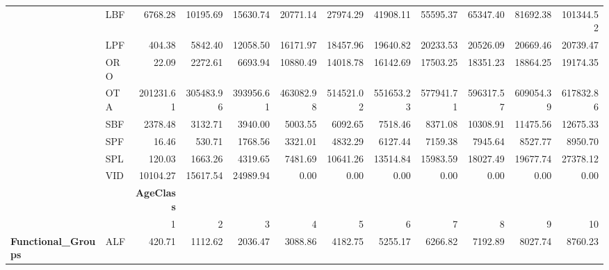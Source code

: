 \documentclass[11pt]{article}
\begin{document}
\begin{table}[htb]
\begin{center}
\begin{tabular}{llrrrrrrrrrr}
                             &  LBF  &            6768.28  &      10195.69  &      15630.74  &      20771.14  &      27974.29  &      41908.11  &      55595.37  &      65347.40  &      81692.38  &     101344.52  \\
                             &  LPF  &             404.38  &       5842.40  &      12058.50  &      16171.97  &      18457.96  &      19640.82  &      20233.53  &      20526.09  &      20669.46  &      20739.47  \\
                             &  ORO  &              22.09  &       2272.61  &       6693.94  &      10880.49  &      14018.78  &      16142.69  &      17503.25  &      18351.23  &      18864.25  &      19174.35  \\
                             &  OTA  &          201231.61  &     305483.96  &     393956.61  &     463082.98  &     514521.02  &     551653.23  &     577941.71  &     596317.57  &     609054.39  &     617832.86  \\
                             &  SBF  &            2378.48  &       3132.71  &       3940.00  &       5003.55  &       6092.65  &       7518.46  &       8371.08  &      10308.91  &      11475.56  &      12675.33  \\
                             &  SPF  &              16.46  &        530.71  &       1768.56  &       3321.01  &       4832.29  &       6127.44  &       7159.38  &       7945.64  &       8527.77  &       8950.70  \\
                             &  SPL  &             120.03  &       1663.26  &       4319.65  &       7481.69  &      10641.26  &      13514.84  &      15983.59  &      18027.49  &      19677.74  &      27378.12  \\
                             &  VID  &           10104.27  &      15617.54  &      24989.94  &          0.00  &          0.00  &          0.00  &          0.00  &          0.00  &          0.00  &          0.00  \\
                             &       &  \textbf{AgeClass}  &                &                &                &                &                &                &                &                &                \\
                             &       &                  1  &             2  &             3  &             4  &             5  &             6  &             7  &             8  &             9  &            10  \\
\hline
 \textbf{Functional_Groups}  &  ALF  &             420.71  &       1112.62  &       2036.47  &       3088.86  &       4182.75  &       5255.17  &       6266.82  &       7192.89  &       8027.74  &       8760.23  \\

\end{tabular}
\end{center}
\end{table}
\end{document}
